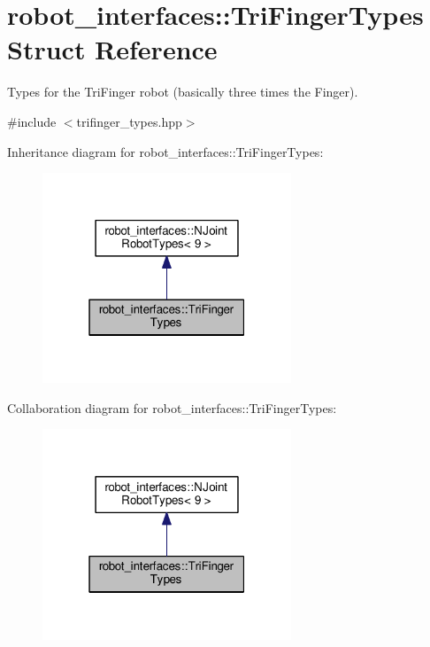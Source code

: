 \hypertarget{structrobot__interfaces_1_1TriFingerTypes}{}\section{robot\+\_\+interfaces\+:\+:Tri\+Finger\+Types Struct Reference}
\label{structrobot__interfaces_1_1TriFingerTypes}


Types for the Tri\+Finger robot (basically three times the Finger).  




{\ttfamily \#include $<$trifinger\+\_\+types.\+hpp$>$}



Inheritance diagram for robot\+\_\+interfaces\+:\+:Tri\+Finger\+Types\+:
\nopagebreak
\begin{figure}[H]
\begin{center}
\leavevmode
\includegraphics[width=211pt]{structrobot__interfaces_1_1TriFingerTypes__inherit__graph}
\end{center}
\end{figure}


Collaboration diagram for robot\+\_\+interfaces\+:\+:Tri\+Finger\+Types\+:
\nopagebreak
\begin{figure}[H]
\begin{center}
\leavevmode
\includegraphics[width=211pt]{structrobot__interfaces_1_1TriFingerTypes__coll__graph}
\end{center}
\end{figure}
